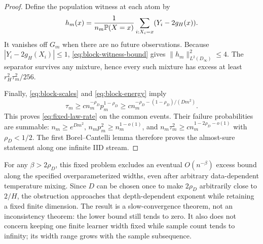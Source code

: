 \begin{proof}
Define the population witness at each atom by
\[
 h_m(x)=\frac1{n_m\mathbb P(X=x)}\sum_{i:X_i=x}(Y_i-2g_H(x)).
\]
It vanishes off $G_m$ when there are no future observations. Because $|Y_i-2g_H(X_i)|\le1$, \eqref{eq:block-witness-bound} gives $\|h_m\|_{L^2(D_\infty)}^2\le4$. The separator survives any mixture, hence every such mixture has excess at least $r_H^2\tau_m^2/256$.

Finally, \eqref{eq:block-scales} and \eqref{eq:block-energy} imply
\[
 \tau_m\ge c n_m^{-\rho_D}p_m^{1-\rho_D}
       \ge c n_m^{-\rho_D-(1-\rho_D)/(Dm^2)}.
\]
This proves \eqref{eq:fixed-law-rate} on the common events. Their failure probabilities are summable: $n_m\ge e^{Dm^2}$, $n_mp_m^2\ge n_m^{1-o(1)}$, and $n_m\tau_m^2\ge c n_m^{1-2\rho_D-o(1)}$ with $\rho_D<1/2$. The first Borel--Cantelli lemma therefore proves the almost-sure statement along one infinite IID stream.
\end{proof}

For any $\beta>2\rho_D$, this fixed problem excludes an eventual $O(n^{-\beta})$ excess bound along the specified overparameterized widths, even after arbitrary data-dependent temperature mixing. Since $D$ can be chosen once to make $2\rho_D$ arbitrarily close to $2/H$, the obstruction approaches that depth-dependent exponent while retaining a fixed finite dimension. The result is a slow-convergence theorem, not an inconsistency theorem: the lower bound still tends to zero. It also does not concern keeping one finite learner width fixed while sample count tends to infinity; its width range grows with the sample subsequence.
